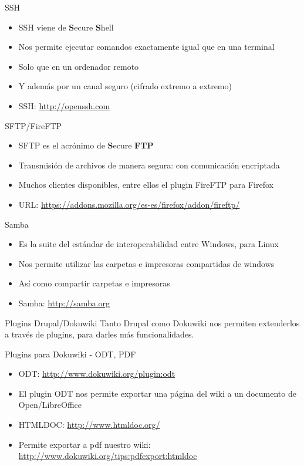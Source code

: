 \documentclass[spanish]{beamer}
\begin{document}
\begin{frame}{SSH}
\begin{itemize}
\item SSH viene de {\bf S}ecure {\bf S}hell
\item Nos permite ejecutar comandos exactamente igual que en una terminal
\item Solo que en un ordenador remoto
\item Y además por un canal seguro (cifrado extremo a extremo)
\item SSH: \url{http://openssh.com}
\end{itemize}
\end{frame}

\begin{frame}{SFTP/FireFTP}
\begin{itemize}
\item SFTP es el acrónimo de {\bf S}ecure {\bf FTP}
\item Transmisión de archivos de manera segura: con comunicación encriptada
\item Muchos clientes disponibles, entre ellos el plugin {\br FireFTP} para Firefox
\item URL: \url{https://addons.mozilla.org/es-es/firefox/addon/fireftp/}
\end{itemize}
\end{frame}

\begin{frame}{Samba}
\begin{itemize}
\item Es la suite del estándar de interoperabilidad entre Windows, para Linux
\item Nos permite utilizar las carpetas e impresoras compartidas de windows 
\item Así como compartir carpetas e impresoras
\item Samba: \url{http://samba.org}
\end{itemize}
\end{frame}

\begin{frame}{Plugins Drupal/Dokuwiki}
Tanto Drupal como Dokuwiki nos permiten extenderlos a través de plugins, para
 darles más funcionalidades.
\end{frame}

\begin{frame}{Plugins para Dokuwiki - ODT, PDF}
\begin{itemize}
\item ODT: \url{http://www.dokuwiki.org/plugin:odt}
\item El plugin ODT nos permite exportar una página del wiki a un documento de
 Open/LibreOffice
\item HTMLDOC: \url{http://www.htmldoc.org/} 
\item Permite exportar a pdf nuestro wiki: \url{http://www.dokuwiki.org/tips:pdfexport:htmldoc}
\end{itemize}
\end{frame}
\end{document}
